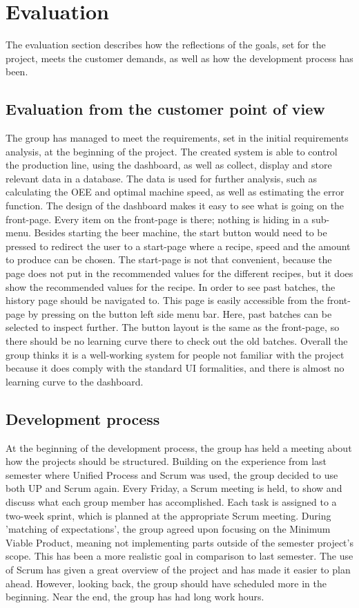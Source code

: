 \section{Evaluation}
The evaluation section describes how the reflections of the goals, set for the
project, meets the customer demands, as well as how the development process has
been.


\subsection{Evaluation from the customer point of view}
The group has managed to meet the requirements, set in the initial requirements
analysis, at the beginning of the project. The created system is able to control
the production line, using the dashboard, as well as collect, display and
store relevant data in a database. The data is used for further analysis, such
as calculating the OEE and optimal machine speed, as well as estimating the
error function.
The design of the dashboard makes it easy to see what is going on the front-page.
Every item on the front-page is there; nothing is hiding in a sub-menu.
Besides starting the beer machine, the start button would need to be pressed
to redirect the user to a start-page where a recipe, speed and the amount to
produce can be chosen. The start-page is not that convenient, because the page 
does not put in the recommended values for the different recipes, but it does
show the recommended values for the recipe.
In order to see past batches, the history page should be navigated to. This page
is easily accessible from the front-page by pressing on the button left
side menu bar. Here, past batches can be selected to inspect further. The button
layout is the same as the front-page, so there should be no learning curve there
to check out the old batches. Overall the group thinks it is a well-working
system for people not familiar with the project because it does comply with the
standard UI formalities, and there is almost no learning curve to the dashboard.


\subsection{Development process}
At the beginning of the development process, the group has held a meeting
about how the projects should be structured. Building on the experience from
last semester where Unified Process and Scrum was used, the group
decided to use both UP and Scrum again. Every Friday, a Scrum meeting is held,
to show and discuss what each group member has accomplished. Each task is
assigned to a two-week sprint, which is planned at the appropriate Scrum
meeting.
During 'matching of expectations', the group agreed upon focusing on the Minimum
Viable Product, meaning not implementing parts outside of the semester project's
scope. This has been a more realistic goal in comparison to last semester.
The use of Scrum has given a great overview of the project and has made it 
easier to plan ahead. However, looking back, the group should have scheduled 
more in the beginning. Near the end, the group has had long work hours.


